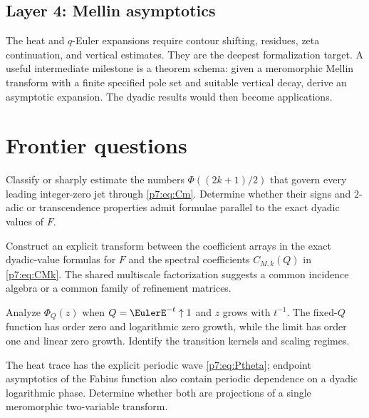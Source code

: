\documentclass[11pt]{article}
\numberwithin{equation}{section}
\theoremstyle{definition}
\theoremstyle{remark}
\begin{document}
\subsection{Layer 4: Mellin asymptotics}

The heat and $q$-Euler expansions require contour shifting, residues, zeta continuation, and vertical estimates.  They are the deepest formalization target.  A useful intermediate milestone is a theorem schema: given a meromorphic Mellin transform with a finite specified pole set and suitable vertical decay, derive an asymptotic expansion.  The dyadic results would then become applications.

\section{Frontier questions}

\begin{problem}
Classify or sharply estimate the numbers $\Phi((2k+1)/2)$ that govern every leading integer-zero jet through \cref{p7:eq:Cm}.  Determine whether their signs and $2$-adic or transcendence properties admit formulae parallel to the exact dyadic values of $F$.
\end{problem}

\begin{problem}
Construct an explicit transform between the coefficient arrays in the exact dyadic-value formulas for $F$ and the spectral coefficients $C_{M,k}(Q)$ in \cref{p7:eq:CMk}.  The shared multiscale factorization suggests a common incidence algebra or a common family of refinement matrices.
\end{problem}

\begin{problem}
Analyze $\Phi_Q(z)$ when $Q=\EulerE^{-t}\uparrow1$ and $z$ grows with $t^{-1}$.  The fixed-$Q$ function has order zero and logarithmic zero growth, while the limit has order one and linear zero growth.  Identify the transition kernels and scaling regimes.
\end{problem}

\begin{problem}
The heat trace has the explicit periodic wave \cref{p7:eq:Ptheta}; endpoint asymptotics of the Fabius function also contain periodic dependence on a dyadic logarithmic phase.  Determine whether both are projections of a single meromorphic two-variable transform.
\end{problem}
\end{document}
